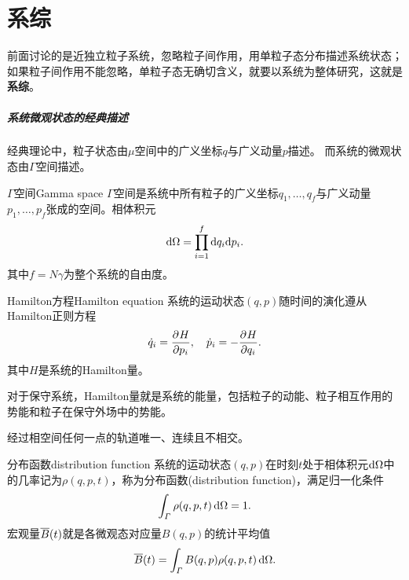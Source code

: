 \newcommand*{\Cr}{\mathrm C}
\newcommand*{\rs}{\mathrm r}
\newcommand*{\st}{\mathrm s}

\chapter{系综}

前面讨论的是近独立粒子系统，忽略粒子间作用，用单粒子态分布描述系统状态；如果粒子间作用不能忽略，单粒子态无确切含义，就要以系统为整体研究，这就是\textbf{系综}。

\paragraph{系统微观状态的经典描述}

经典理论中，粒子状态由$\mu$空间中的广义坐标$q$与广义动量$p$描述。
而系统的微观状态由$\varGamma$空间描述。

\begin{definition}{$\varGamma$空间}{Gamma space}
	$\varGamma$空间是系统中所有粒子的广义坐标$q_1,\ldots,q_f$与广义动量$p_1,\ldots,p_f$张成的空间。相体积元
	\begin{equation}
		\mathop{}\!\mathrm{d}\Omega=\prod_{i=1}^f\mathop{}\!\mathrm{d} q_i\mathrm{d} p_i.
	\end{equation}
	其中$f=N\gamma$为整个系统的自由度。
\end{definition}

\begin{theorem}
	{Hamilton方程}{Hamilton equation}
	系统的运动状态$(q,p)$随时间的演化遵从Hamilton正则方程
	\begin{equation}
		\dot q_i=\frac{\partial^{{}}H}{\partial{p_i}^{{}}},\quad \dot p_i=-\frac{\partial^{{}}H}{\partial{q_i}^{{}}}.
	\end{equation}
	其中$H$是系统的Hamilton量。
\end{theorem}

\begin{remark}
	对于保守系统，Hamilton量就是系统的能量，包括粒子的动能、粒子相互作用的势能和粒子在保守外场中的势能。
\end{remark}

\begin{corollary}
	经过相空间任何一点的轨道唯一、连续且不相交。
\end{corollary}

\begin{definition}
	{分布函数}{distribution function}
	系统的运动状态$(q,p)$在时刻$t$处于相体积元$\mathop{}\!\mathrm{d}\Omega$中的几率记为$\rho(q,p,t)$，称为分布函数(distribution function)，满足归一化条件
	\[
		\int_\varGamma\rho(q,p,t)\mathop{}\!\mathrm{d}\Omega=1.
	\]
	宏观量$\overline{B}(t)$就是各微观态对应量$B(q,p)$的统计平均值
	\begin{equation}
		\overline{B}(t)=\int_\varGamma B(q,p)\rho(q,p,t)\mathop{}\!\mathrm{d}\Omega.
	\end{equation}
\end{definition}

